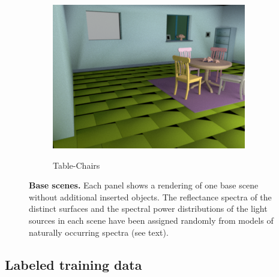 \documentclass{jov}
\begin{document}
\begin{figure}[t]
\begin{subfigure}[b]{0.22 \textwidth}
        \caption{Table-Chairs}    
        \includegraphics[width=\textwidth]{../FiguresDraft5/Figure2/Figure2_c.png}
        \label{fig:baseSceneTableChairs}
    \end{subfigure}
    \caption{{\bf Base scenes.} Each panel shows a rendering of one base scene without additional inserted objects.  The reflectance spectra of the distinct surfaces and the spectral power distributions of the light sources in each scene have been assigned randomly from models of naturally occurring spectra (see text).}\label{fig:baseScenes}
\end{figure}

\subsection{Labeled training data} \label{method:VirtualWorld}
\end{document}
